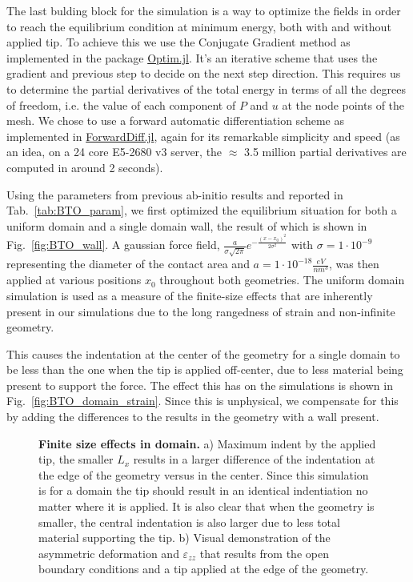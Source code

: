 The last bulding block for the simulation is a way to optimize the fields in order to reach the equilibrium condition at minimum energy, both with and without applied tip.
To achieve this we use the Conjugate Gradient method \cite{Hestenes1952,Hager2005} as implemented in the package \href{https://github.com/JuliaNLSolvers/Optim.jl}{Optim.jl}.
It's an iterative scheme that uses the gradient and previous step to decide on the next step direction. 
This requires us to determine the partial derivatives of the total energy in terms of all the degrees of freedom, i.e. the value of each component of $P$ and $u$ at the node points of the mesh.
We chose to use a forward automatic differentiation scheme as implemented in \href{www.juliadiff.org/ForwardDiff.jl/latest/}{ForwardDiff.jl}, again for its remarkable simplicity and speed (as an idea, on a 24 core E5-2680 v3 server, the $\approx$ 3.5 million partial derivatives are computed in around 2 seconds).

Using the parameters from previous ab-initio results \cite{Marton2010} and reported in Tab.~\ref{tab:BTO_param}, we first optimized the equilibrium situation for both a uniform domain and a single domain wall, the result of which is shown in Fig.~\ref{fig:BTO_wall}.
A gaussian force field, $\frac{a}{\sigma \sqrt{2\pi}}e^{-\frac{(x-x_0)^2}{2\sigma^2}}$ with $\sigma = 1 \cdot 10^{-9}$ representing the diameter of the contact area and $a = 1 \cdot 10^{-18} \frac{eV}{nm^3}$, was then applied at various positions $x_0$ throughout both geometries.
The uniform domain simulation is used as a measure of the finite-size effects that are inherently present in our simulations due to the long rangedness of strain and non-infinite geometry.

This causes the indentation at the center of the geometry for a single domain to be less than the one when the tip is applied off-center, due to less material being present to support the force.
The effect this has on the simulations is shown in Fig.~\ref{fig:BTO_domain_strain}.
Since this is unphysical, we compensate for this by adding the differences to the results in the geometry with a wall present.

\begin{figure}
	\caption{\label{fig:fig:BTO_domain_strain}{\bf Finite size effects in domain.} a) Maximum indent by the applied tip, the smaller $L_x$ results in a larger difference of the indentation at the edge of the  geometry versus in the center. Since this simulation is for a domain the tip should result in an identical indentiation no matter where it is applied. It is also clear that when the geometry is smaller, the central indentation is also larger due to less total material supporting the tip. b) Visual demonstration of the asymmetric deformation and $\varepsilon_{zz}$ that results from the open boundary conditions and a tip applied at the edge of the geometry.}
\end{figure}


